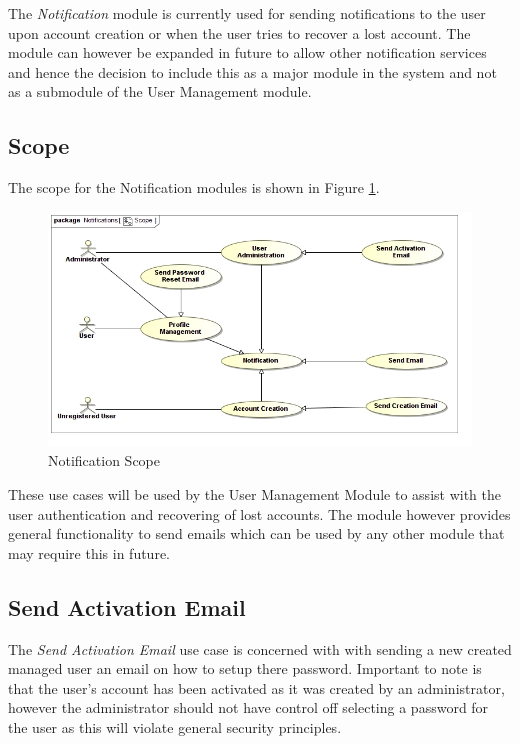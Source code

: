 The \textit{Notification} module is currently used for sending notifications to
the user upon account creation or when the user tries to recover a lost account.
The module can however be expanded in future to allow other notification 
services and hence the decision to include this as a major module in the system
and not as a submodule of the User Management module.

\subsection{Scope}
The scope for the Notification modules is shown in Figure \ref{fig:notificationScope}.
\begin{figure}[H]
	\begin{center}
		\includegraphics[scale=0.38]{../Diagrams and Charts/Notifications/Scope.jpg}
		\caption{Notification Scope}
		\label{fig:notificationScope}
	\end{center}	
\end{figure}

These use cases will be used by the User Management Module to assist with the
user authentication and recovering of lost accounts. The module however provides
general functionality to send emails which can be used by any other module that
may require this in future.

\subsection{Send Activation Email}
The \textit{Send Activation Email} use case is concerned with with sending
a new created managed user an email on how to setup there password. Important to
note is that the user's account has been activated as it was created by an
administrator, however the administrator should not have control off selecting a
password for the user as this will violate general security principles.

